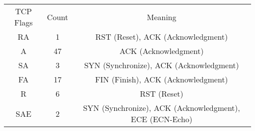 \begin{tabular}{ccc}
TCP Flags & Count & Meaning \\
RA & 1 & RST (Reset), ACK (Acknowledgment) \\
A & 47 & ACK (Acknowledgment) \\
SA & 3 & SYN (Synchronize), ACK (Acknowledgment) \\
FA & 17 & FIN (Finish), ACK (Acknowledgment) \\
R & 6 & RST (Reset) \\
SAE & 2 & SYN (Synchronize), ACK (Acknowledgment), ECE (ECN-Echo) \\
\end{tabular}